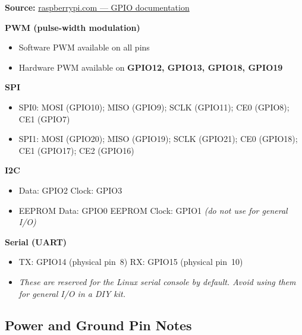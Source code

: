 \documentclass[11pt,a4paper]{article}
\begin{document}
\begin{notebox}
\textbf{Source:}
\href{https://www.raspberrypi.com/documentation/computers/raspberry-pi.html\#gpio}%
{raspberrypi.com --- GPIO documentation}

\smallskip
\textbf{PWM (pulse-width modulation)}
\begin{itemize}[noitemsep,topsep=2pt]
  \item Software PWM available on all pins
  \item Hardware PWM available on \textbf{GPIO12, GPIO13, GPIO18, GPIO19}
\end{itemize}

\textbf{SPI}
\begin{itemize}[noitemsep,topsep=2pt]
  \item SPI0: MOSI (GPIO10); MISO (GPIO9); SCLK (GPIO11);
        CE0 (GPIO8); CE1 (GPIO7)
  \item SPI1: MOSI (GPIO20); MISO (GPIO19); SCLK (GPIO21);
        CE0 (GPIO18); CE1 (GPIO17); CE2 (GPIO16)
\end{itemize}

\textbf{I2C}
\begin{itemize}[noitemsep,topsep=2pt]
  \item Data: GPIO2 \quad Clock: GPIO3
  \item EEPROM Data: GPIO0 \quad EEPROM Clock: GPIO1
        \quad \textit{(do not use for general I/O)}
\end{itemize}

\textbf{Serial (UART)}
\begin{itemize}[noitemsep,topsep=2pt]
  \item TX: GPIO14 (physical pin~8) \quad RX: GPIO15 (physical pin~10)
  \item \textit{These are reserved for the Linux serial console by default.
        Avoid using them for general I/O in a DIY kit.}
\end{itemize}
\end{notebox}

\subsection{Power and Ground Pin Notes}
\end{document}
